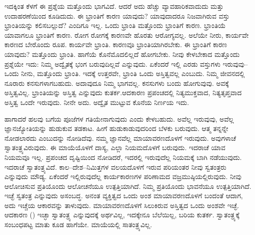ಇದಕ್ಕಿಂತ ಕೆಳಗೆ ಈ ಪ್ರಶ್ನೆಯ ಮತ್ತೊಂದು ಭಾಗವಿದೆ. ಆದರೆ ಅದು ಹೆಚ್ಚು ವ್ಯಾವಹಾರಿಕವಾದುದು ಮತ್ತು ಉದಾಹರಣೆಯಿಂದ ಕೂಡಿದುದು. ಈ ಭ್ರಾಂತಿಗೆ ಕಾರಣ ಯಾವುದು? ಯಾವುದಾದರೂ ನಿಜವಾಗಿರುವ ವಸ್ತು ಭ್ರಾಂತಿಯನ್ನು ಕಲಿಸಬಲ್ಲುದೆ? ಎಂದಿಗೂ ಇಲ್ಲ. ಒಂದು ಭ್ರಾಂತಿ ಮತ್ತೊಂದು ಭ್ರಾಂತಿಗೆ ಕಾರಣ. ಭ್ರಾಂತಿಯೆ ಯಾವಾಗಲೂ ಭ್ರಾಂತಿಗೆ ಕಾರಣ. ರೋಗ ರೋಗಕ್ಕೆ ಕಾರಣವೇ ಹೊರತು ಆರೋಗ್ಯವಲ್ಲ. ಅಲೆಯೇ ನೀರು, ಕಾರ್ಯವೇ ಕಾರಣದ ಬೇರೊಂದು ರೂಪ. ಕಾರ್ಯವೇ ಭ್ರಾಂತಿ. ಕಾರಣವೂ ಭ್ರಾಂತಿಯಾಗಿರಬೇಕು. ಈ ಭ್ರಾಂತಿಗೆ ಕಾರಣ ಯಾವುದು? ಮತ್ತೊಂದು ಭ್ರಾಂತಿ. ಹಾಗೆಯೆ ಕೊನೆಮೊದಲಿಲ್ಲದೆ ಹೋಗಬೇಕು. ನೀವು ಕೇಳಬೇಕಾದ ಮತ್ತೊಂದು ಪ್ರಶ್ನೆಯೇ ಇದು: ನಿಮ್ಮ ಅದ್ವೈತಕ್ಕೆ ಭಂಗ ಬರುವುದಿಲ್ಲವೆ ಎನ್ನುವುದು. ಏಕೆಂದರೆ ಇಲ್ಲಿ ಎರಡು ವಸ್ತುಗಳು ಇರುವುವು–ಒಂದು ನೀನು, ಮತ್ತೊಂದು ಭ್ರಾಂತಿ. ಇದಕ್ಕೆ ಉತ್ತರವೇ, ಭ್ರಾಂತಿ ಒಂದು ಅಸ್ತಿತ್ವವಲ್ಲ ಎಂಬುದು. ನಿಮ್ಮ ಜೀವನದಲ್ಲಿ ನೂರಾರು ಕನಸುಗಳಾಗಬಹುದು. ಅದಾವುದೂ ನಿಮ್ಮ ಭಾಗವಲ್ಲ. ಕನಸುಗಳು ಬಂದು ಹೋಗುವುವು. ಅವಕ್ಕೆ ಅಸ್ತಿತ್ವವಿಲ್ಲ. ಭ್ರಾಂತಿಯನ್ನು ಅಸ್ತಿತ್ವ ಎನ್ನುವುದು ಕುತರ್ಕ.\break ಆದಕಾರಣ ಪ್ರಪಂಚದಲ್ಲಿ ನಿತ್ಯಮುಕ್ತವಾದ, ನಿತ್ಯತೃಪ್ತವಾದ ಅಸ್ತಿತ್ವ ಒಂದೇ ಇರುವುದು. ನೀನೇ ಅದು. ಅದ್ವೈತ ಮುಟ್ಟುವ ಕೊನೆಯ ನಿರ್ಣಯ ಇದು.

ಹಾಗಾದರೆ ಹಲವು ಬಗೆಯ ಪೂಜೆಗಳ ಗತಿಯೇನಾಗುವುದು ಎಂದು ಕೇಳಬಹುದು. ಅವೆಲ್ಲ ಇರುವುವು, ಅವೆಲ್ಲ ಜ್ಞಾನಜ್ಯೋತಿಯನ್ನು ಹುಡುಕುವ ತಡಕಾಟ. ಹೀಗೆ ಹುಡುಕಾಡುವುದರಿಂದ ಬೆಳಕು ಬರುವುದು. ಆತ್ಮ ತನ್ನನ್ನೇ ನೋಡಲಾರದು ಎಂಬುದನ್ನು ನೋಡಿದೆವು. ನಮ್ಮ ಜ್ಞಾನವೆಲ್ಲ ಮಾಯಾವರಣದೊಳಗೆ ಇರುವುದು. ಅವುಗಳಾಚೆ ಸ್ವಾತಂತ್ರ್ಯವಿರುವುದು. ಈ ಮಾಯೆಯೊಳಗೆ ದಾಸ್ಯ, ಎಲ್ಲಾ ನಿಯಮದೊಳಗೆ ಬರುವುದು. ಇದರಾಚೆ ಯಾವ ನಿಯಮವೂ ಇಲ್ಲ. ಪ್ರಪಂಚದ ದೃಷ್ಟಿಯಿಂದ ನೋಡಿದರೆ, ಇದರಲ್ಲಿ ಇರುವುದೆಲ್ಲ ನಿಯಮಕ್ಕೆ ಬಾಗಿ ನಡೆಯುವುದು. ಇದರಾಚೆ ಸ್ವಾತಂತ್ರ್ಯವಿದೆ. ಕಾಲ–ದೇಶ–ನಿಮಿತ್ತಗಳ ವಲಯದೊಳಗೆ ಇರುವ ಪರಿಯಂತರ ನೀವು ಸ್ವತಂತ್ರರು ಎನ್ನುವುದು ಮೌಡ್ಯ. ಏಕೆಂದರೆ ಇಲ್ಲಿರುವುದೆಲ್ಲ ಕಾರ್ಯಕಾರಣಗಳ ಪರಿಣಾಮದ ವಜ್ರಮುಷ್ಠಿಯಲ್ಲಿರುವುದು. ನೀವು ಆಲೋಚಿಸುವ ಪ್ರತಿಯೊಂದು ಆಲೋಚನೆಯೂ ಉತ್ಪತ್ತಿಯಾಗಿದೆ. ನಿಮ್ಮ ಪ್ರತಿಯೊಂದು ಭಾವನೆಯೂ ಉತ್ಪತ್ತಿಯಾಗಿದೆ. ಇಚ್ಛೆ ಸ್ವತಂತ್ರ ಎನ್ನುವುದು ಅಸಂಬದ್ಧ. ಅನಂತ ವ್ಯಕ್ತಿತ್ವದ ಒಂದು ಅಂಶ ಮಾಯಾವರಣದೊಳಗೆ ಬಂದಂತೆ ಆದಾಗ, ಅದು ಇಚ್ಚೆಯ ಆಕಾರವನ್ನು ತಾಳುವುದು. ಮಾಯಾವರಣದೊಳಗೆ ಸಿಲುಕಿರುವ ಅಸ್ತಿತ್ವದ ಒಂದು ಅಂಶವೇ ಇಚ್ಛೆ. ಆದಕಾರಣ () ಇಚ್ಛಾ ಸ್ವಾತಂತ್ರ್ಯ ಎನ್ನುವುದಕ್ಕೆ ಅರ್ಥವಿಲ್ಲ, ಇದಕ್ಕೇನೂ ಬೆಲೆಯಿಲ್ಲ, ಬರಿಯ ಕುತರ್ಕ. ಸ್ವಾತಂತ್ರ್ಯಕ್ಕೆ ಸಂಬಂಧಪಟ್ಟ ಮಾತು ಕೂಡ ಹಾಗೆಯೇ. ಮಾಯೆಯಲ್ಲಿ ಸಾತಂತ್ರ್ಯವಿಲ್ಲ.

